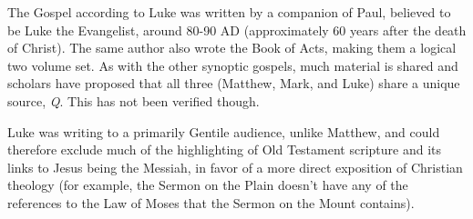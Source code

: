 
The Gospel according to Luke was written by a companion of Paul, believed to be Luke the Evangelist, around 80-90 AD (approximately 60 years after the death of Christ). The same author also wrote the Book of Acts, making them a logical two volume set. As with the other synoptic gospels, much material is shared and scholars have proposed that all three (Matthew, Mark, and Luke) share a unique source, {\it Q}. This has not been verified though.

Luke was writing to a primarily Gentile audience, unlike Matthew, and could therefore exclude much of the highlighting of Old Testament scripture and its links to Jesus being the Messiah, in favor of a more direct exposition of Christian theology (for example, the Sermon on the Plain doesn't have any of the references to the Law of Moses that the Sermon on the Mount contains).
